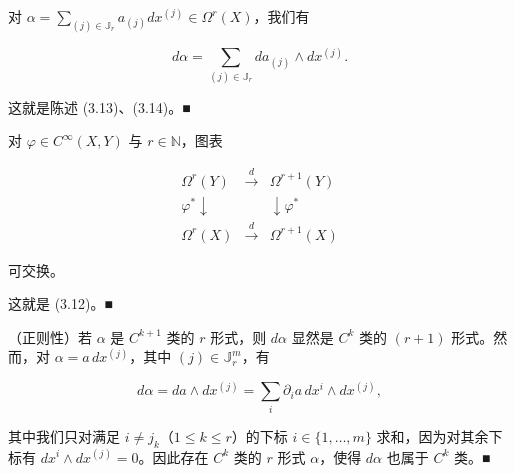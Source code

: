 \begin{remark}

\begin{items}
\item

对 $ \alpha = \sum_{(j) \in \mathbb{J}_{r}} a_{(j)}dx^{(j)} \in \Omega^{r}(X) $，我们有

\[
d\alpha = \sum_{(j) \in \mathbb{J}_{r}} da_{(j)} \wedge dx^{(j)}.
\]

\proofhead
这就是陈述 (3.13)、(3.14)。\nobreak\hspace{0.35em}■
\item

对 $ \varphi \in C^{\infty}(X, Y) $ 与 $ r \in \mathbb{N} $，图表

\begin{equation*}
\begin{array}{ccc} \Omega^{r}(Y) & \xrightarrow{d} & \Omega^{r+1}(Y) \\ \varphi^{\ast}\downarrow & & \downarrow\varphi^{\ast} \\ \Omega^{r}(X) & \xrightarrow{d} & \Omega^{r+1}(X) \end{array}
\end{equation*}

可交换。

\proofhead
这就是 (3.12)。\nobreak\hspace{0.35em}■
\item

（正则性）若 $ \alpha $ 是 $ C^{k+1} $ 类的 $ r $ 形式，则 $ d\alpha $ 显然是 $ C^{k} $ 类的 $ (r+1) $ 形式。然而，对 $ \alpha = a\,dx^{(j)} $，其中 $ (j) \in \mathbb{J}_{r}^{m} $，有

\[
d\alpha = da \wedge dx^{(j)} = \sum_{i} \partial_{i} a\, dx^{i} \wedge dx^{(j)},
\]

其中我们只对满足 $ i \neq j_{k} $（$ 1 \le k \le r $）的下标 $ i \in \{1, \ldots, m\} $ 求和，因为对其余下标有 $ dx^{i} \wedge dx^{(j)} = 0 $。因此存在 $ C^{k} $ 类的 $ r $ 形式 $ \alpha $，使得 $ d\alpha $ 也属于 $ C^{k} $ 类。\nobreak\hspace{0.35em}■

\end{items}

\end{remark}

